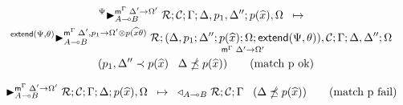 
\begin{multline}
\transx{\matstateb{A \lolli B}{\rulestk}{\lstack{C}}{\Gamma}{\Delta, p_1,
\Delta''}{p(\widehat{x}),
   \Omega}{\Delta' \rightarrow \Omega'}{\Psi}}
{\matstateb{A \lolli B}{\rulestk}{\lframe{\Delta,
p_1}{\Delta''}{p(\widehat{x})}{\Omega; \m{extend}(\Psi, \theta)}{\Delta'}{\Omega'}, \lstack{C}}{\Gamma}{\Delta,
   \Delta''}{\Omega}{\Delta', p_1 \rightarrow \Omega' \otimes
      p(\widehat{x}\theta)}{\m{extend}(\Psi, \theta)}} \\
   \;\;\; (p_1,
   \Delta'' \prec p(\widehat{x}) \;\;\; \Delta \npreceq p(\widehat{x}))
   \tag{match p ok}
\end{multline}

\begin{align}
   \trans{\matstate{A \lolli
   B}{\rulestk}{\lstack{C}}{\Gamma}{\Delta}{p(\widehat{x}),
   \Omega}{\Delta' \rightarrow \Omega'}}
{\contstate{A \lolli B}{\rulestk}{\lstack{C}}{\Gamma}} \;\;\; (\Delta \npreceq
p(\widehat{x})) \tag{match p fail}
\end{align}
